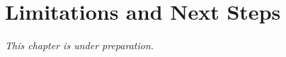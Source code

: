 
\chapter{Limitations and Next Steps}
\label{ch:limitations}

\textit{This chapter is under preparation.}
